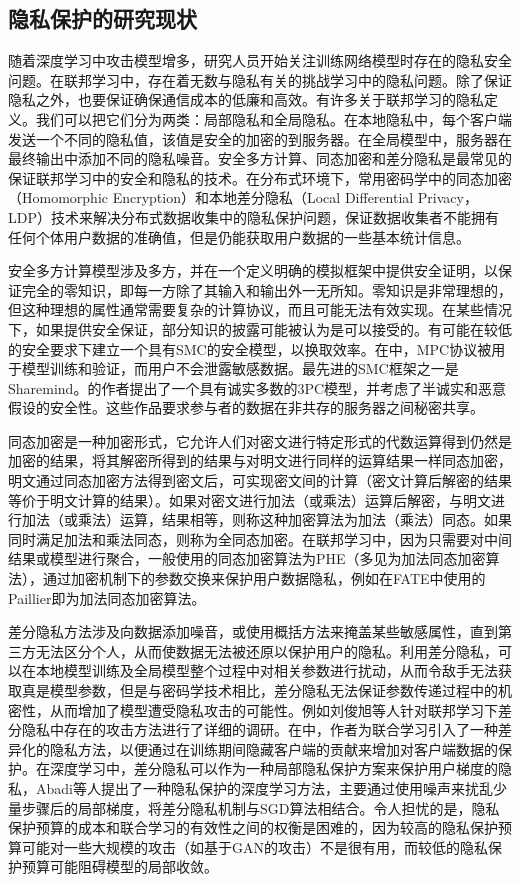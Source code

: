 \subsection{隐私保护的研究现状}
随着深度学习中攻击模型增多，研究人员开始关注训练网络模型时存在的隐私安全问题。在联邦学习中，存在着无数与隐私有关的挑战学习中的隐私问题。除了保证隐私之外，也要保证确保通信成本的低廉和高效。有许多关于联邦学习的隐私定义。我们可以把它们分为两类：局部隐私和全局隐私。在本地隐私中，每个客户端发送一个不同的隐私值，该值是安全的加密的到服务器。在全局模型中，服务器在最终输出中添加不同的隐私噪音。安全多方计算、同态加密和差分隐私是最常见的保证联邦学习中的安全和隐私的技术。在分布式环境下，常用密码学中的同态加密（Homomorphic Encryption）和本地差分隐私（Local Differential Privacy， LDP）技术来解决分布式数据收集中的隐私保护问题，保证数据收集者不能拥有任何个体用户数据的准确值，但是仍能获取用户数据的一些基本统计信息。

安全多方计算模型涉及多方，并在一个定义明确的模拟框架中提供安全证明，以保证完全的零知识，即每一方除了其输入和输出外一无所知。零知识是非常理想的，但这种理想的属性通常需要复杂的计算协议，而且可能无法有效实现。在某些情况下，如果提供安全保证，部分知识的披露可能被认为是可以接受的。有可能在较低的安全要求下建立一个具有SMC的安全模型，以换取效率。在中，MPC协议被用于模型训练和验证，而用户不会泄露敏感数据。最先进的SMC框架之一是Sharemind。的作者提出了一个具有诚实多数的3PC模型，并考虑了半诚实和恶意假设的安全性。这些作品要求参与者的数据在非共存的服务器之间秘密共享。

同态加密是一种加密形式，它允许人们对密文进行特定形式的代数运算得到仍然是加密的结果，将其解密所得到的结果与对明文进行同样的运算结果一样同态加密，明文通过同态加密方法得到密文后，可实现密文间的计算（密文计算后解密的结果等价于明文计算的结果）。如果对密文进行加法（或乘法）运算后解密，与明文进行加法（或乘法）运算，结果相等，则称这种加密算法为加法（乘法）同态。如果同时满足加法和乘法同态，则称为全同态加密。在联邦学习中，因为只需要对中间结果或模型进行聚合，一般使用的同态加密算法为PHE（多见为加法同态加密算法），通过加密机制下的参数交换来保护用户数据隐私，例如在FATE中使用的Paillier即为加法同态加密算法。

差分隐私方法涉及向数据添加噪音，或使用概括方法来掩盖某些敏感属性，直到第三方无法区分个人，从而使数据无法被还原以保护用户的隐私。利用差分隐私，可以在本地模型训练及全局模型整个过程中对相关参数进行扰动，从而令敌手无法获取真是模型参数，但是与密码学技术相比，差分隐私无法保证参数传递过程中的机密性，从而增加了模型遭受隐私攻击的可能性。例如刘俊旭等人针对联邦学习下差分隐私中存在的攻击方法进行了详细的调研。在中，作者为联合学习引入了一种差异化的隐私方法，以便通过在训练期间隐藏客户端的贡献来增加对客户端数据的保护。在深度学习中，差分隐私可以作为一种局部隐私保护方案来保护用户梯度的隐私，Abadi等人提出了一种隐私保护的深度学习方法，主要通过使用噪声来扰乱少量步骤后的局部梯度，将差分隐私机制与SGD算法相结合。令人担忧的是，隐私保护预算的成本和联合学习的有效性之间的权衡是困难的，因为较高的隐私保护预算可能对一些大规模的攻击（如基于GAN的攻击）不是很有用，而较低的隐私保护预算可能阻碍模型的局部收敛。


